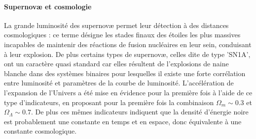 \paragraph{Supernovæ et cosmologie}
La grande luminosité des supernovæ permet leur détection à des distances cosmologiques : ce terme désigne les stades finaux des étoiles les plus massives incapables de maintenir des réactions de fusion nucléaires en leur sein, conduisant à leur explosion. De plus certains types de supernovæ, celles dite de type 'SN1A', ont un caractère quasi standard car elles résultent de l'explosions de naine blanche dans des systèmes binaires pour lesquelles il existe une forte corrélation entre luminosité et paramètres de la courbe de luminosité. L'accélération  de l'expansion de l'Univers a été mise en évidence pour la première fois à l'aide de ce type d'indicateurs, en proposant pour la première fois la combinaison $\Omega_m\sim0.3$ et $\Omega_\Lambda\sim0.7$. De plus ces mêmes indicateurs indiquent que la densité d'énergie noire est probablement une constante en temps et en espace, donc équivalente à une constante cosmologique.

